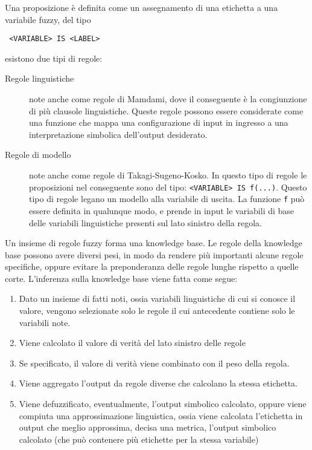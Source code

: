 Una proposizione è definita come un assegnamento di una etichetta a una variabile fuzzy, del tipo
\begin{verbatim}
 <VARIABLE> IS <LABEL>
\end{verbatim}

esistono due tipi di regole:
\begin{description}
 \item [Regole linguistiche] note anche come regole di Mamdami, dove il conseguente è la congiunzione di più clausole linguistiche. Queste regole possono essere considerate come una funzione che mappa una configurazione di input in ingresso a una interpretazione simbolica dell'output desiderato. 
 \item [Regole di modello] note anche come regole di Takagi-Sugeno-Kosko. In questo tipo di regole le proposizioni nel conseguente sono del tipo: \verb|<VARIABLE> IS f(...)|. Questo tipo di regole legano un modello alla variabile di uscita. La funzione \verb|f| può essere definita in qualunque modo, e prende in input le variabili di base delle variabili linguistiche presenti sul lato sinistro della regola.

\end{description}


Un insieme di regole fuzzy forma una knowledge base. Le regole della knowledge base possono avere diversi pesi, in modo da rendere più importanti alcune regole specifiche, oppure evitare la preponderanza delle regole lunghe rispetto a quelle corte.
L'inferenza sulla knowledge base viene fatta come segue: 

\begin{enumerate}
 \item Dato un insieme di fatti noti, ossia variabili linguistiche di cui si conosce il valore, vengono selezionate solo le regole il cui antecedente contiene solo le variabili note.
 \item Viene calcolato il valore di verità del lato sinistro delle regole
 \item Se specificato, il valore di verità viene combinato con il peso della regola.
 \item Viene aggregato l'output da regole diverse che calcolano la stessa etichetta.
 \item Viene defuzzificato, eventualmente, l'output simbolico calcolato, oppure viene compiuta una approssimazione linguistica, ossia viene calcolata l'etichetta in output che meglio approssima, decisa una metrica, l'output simbolico calcolato (che può contenere più etichette per la stessa variabile)
\end{enumerate}

